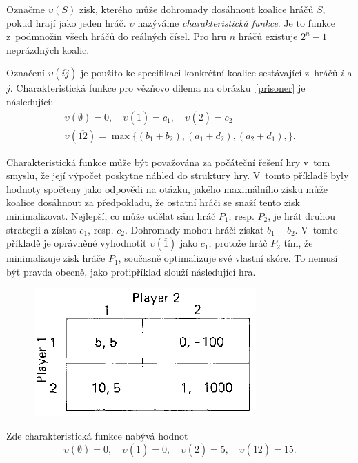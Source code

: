 \documentclass[a5paper,12pt]{article}
\begin{document}

    Označme $\upsilon(S)$ zisk, kterého může dohromady dosáhnout koalice hráčů $S$, pokud hrají jako jeden hráč. $\upsilon$ nazýváme \emph{charakteristická funkce}. Je to funkce z~podmnožin všech hráčů do reálných čísel. Pro hru $n$ hráčů existuje $2^n-1$ neprázdných koalic.

    Označení $\upsilon(\overline{ij})$ je použito ke specifikaci konkrétní koalice sestávající z~hráčů $i$ a $j$. Charakteristická funkce pro vězňovo dilema na obrázku~\ref{prisoner} je následující:
    \begin{gather*}
    \upsilon(\emptyset)=0, \quad \upsilon(\overline{1})=c_1, \quad \upsilon(\overline{2})=c_2\\
    \upsilon(\overline{12})=\max \{ (b_1+b_2),(a_1+d_2),(a_2+d_1), \}.
    \end{gather*}

    Charakteristická funkce může být považována za počáteční řešení hry v~tom smyslu, že její výpočet poskytne náhled do struktury hry. V~tomto příkladě byly hodnoty spočteny jako odpovědi na otázku, jakého maximálního zisku může koalice dosáhnout za předpokladu, že ostatní hráči se snaží tento zisk minimalizovat. Nejlepší, co může udělat sám hráč $P_1$, resp. $P_2$, je hrát druhou strategii a získat $c_1$, resp. $c_2$. Dohromady mohou hráči získat $b_1+b_2$. V~tomto příkladě je oprávněné vyhodnotit $\upsilon(\overline{1})$ jako $c_1$, protože hráč $P_2$ tím, že minimalizuje zisk hráče $P_1$, současně optimalizuje své vlastní skóre. To nemusí být pravda obecně, jako protipříklad slouží následující hra.

    \begin{figure}[htb]
    \centering
    \includegraphics[scale=0.35]{1_5.png}
    \caption{}
    \end{figure}
     
     Zde charakteristická funkce nabývá hodnot
    \[
    \upsilon(\emptyset)=0, \quad \upsilon(\overline{1})=0, \quad \upsilon(\overline{2})=5, \quad
    \upsilon(\overline{12})=15.
    \]
\end{document}
